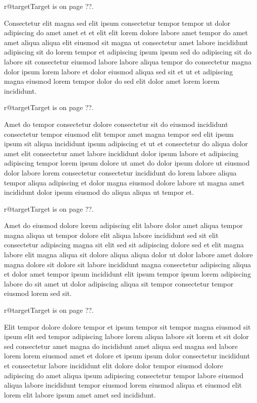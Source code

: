 \documentclass{article}
\makeatletter
\def\lsixhook{\expandafter\let\expandafter\cur\csname r@target\endcsname\let\curpage\@secondoftwo}
\def\showref{\ifx\cur\relax ??\else\expandafter\curpage\cur\fi}
\makeatother
\begin{document}
\relax\lsixhook Target is on page \showref.

Consectetur elit magna sed elit ipsum consectetur tempor tempor ut dolor adipiscing do amet amet et et elit elit lorem dolore labore amet tempor do amet amet aliqua aliqua elit eiusmod sit magna ut consectetur amet labore incididunt adipiscing sit do lorem tempor et adipiscing ipsum ipsum sed do adipiscing sit do labore sit consectetur eiusmod labore labore aliqua tempor do consectetur magna dolor ipsum lorem labore et dolor eiusmod aliqua sed sit et ut et adipiscing magna eiusmod lorem tempor dolor do sed elit dolor amet lorem lorem incididunt.

\relax\lsixhook Target is on page \showref.

Amet do tempor consectetur dolore consectetur sit do eiusmod incididunt consectetur tempor eiusmod elit tempor amet magna tempor sed elit ipsum ipsum sit aliqua incididunt ipsum adipiscing et ut et consectetur do aliqua dolor amet elit consectetur amet labore incididunt dolor ipsum labore et adipiscing adipiscing tempor lorem ipsum dolore ut amet do dolor ipsum dolore ut eiusmod dolor labore lorem consectetur consectetur incididunt do lorem labore aliqua tempor aliqua adipiscing et dolor magna eiusmod dolore labore ut magna amet incididunt dolor ipsum eiusmod do aliqua aliqua ut tempor et.

\relax\lsixhook Target is on page \showref.

Amet do eiusmod dolore lorem adipiscing elit labore dolor amet aliqua tempor magna aliqua ut tempor dolore elit aliqua labore incididunt sed sit elit consectetur adipiscing magna sit elit sed sit adipiscing dolore sed et elit magna labore elit magna aliqua sit dolore aliqua aliqua dolor ut dolor labore amet dolore magna dolore sit dolore sit labore incididunt magna consectetur adipiscing aliqua et dolor amet tempor ipsum incididunt elit ipsum tempor ipsum lorem adipiscing labore do sit amet ut dolor adipiscing aliqua sit tempor consectetur tempor eiusmod lorem sed sit.

\relax\lsixhook Target is on page \showref.

Elit tempor dolore dolore tempor et ipsum tempor sit tempor magna eiusmod sit ipsum elit sed tempor adipiscing labore lorem aliqua labore sit lorem et sit dolor sed consectetur amet magna do incididunt amet aliqua sed magna sed labore lorem lorem eiusmod amet et dolore et ipsum ipsum dolor consectetur incididunt et consectetur labore incididunt elit dolore dolor tempor eiusmod dolore adipiscing do amet aliqua ipsum adipiscing consectetur tempor labore eiusmod aliqua labore incididunt tempor eiusmod lorem eiusmod aliqua et eiusmod elit lorem elit labore ipsum amet amet sed incididunt.
\end{document}
